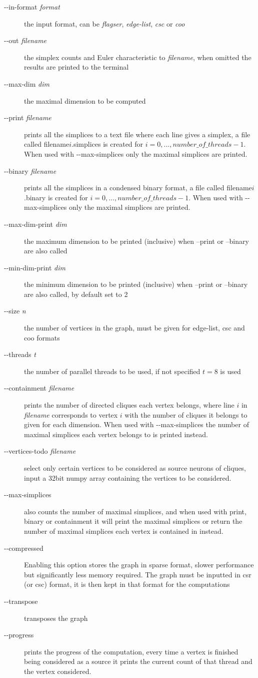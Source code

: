 \documentclass{amsart}
\theoremstyle{definition}
\begin{document}
\enlargethispage{\baselineskip}
\begin{description}
  \item [-{}-in-format \textit{format}] the input format, can be \emph{flagser}, \emph{edge-list}, \emph{csc} or \emph{coo}
  \item [-{}-out \textit{filename}] the simplex counts and Euler characteristic to \textit{filename}, when omitted the results are printed to the terminal
  \item [-{}-max-dim \textit{dim}] the maximal dimension to be computed
  \item [-{}-print \textit{filename}] prints all the simplices to a text file where each line gives a simplex, a file called filename$i$.simplices is created for $i=0,...,number\_of\_threads-1$. When used with -{}-max-simplices only the maximal simplices are printed.
  \item [-{}-binary \textit{filename}] prints all the simplices in a condensed binary format, a file called filename$i$.binary is created for $i=0,...,number\_of\_threads-1$. When used with -{}-max-simplices only the maximal simplices are printed.
  \item [-{}-max-dim-print \textit{dim}] the maximum dimension to be printed (inclusive) when --print or --binary are also called
  \item [-{}-min-dim-print \textit{dim}] the minimum dimension to be printed (inclusive) when --print or --binary are also called, by default set to 2
  \item [-{}-size \textit{n}] the number of vertices in the graph, must be given for edge-list, csc and coo formats
  \item [-{}-threads \textit{t}] the number of parallel threads to be used, if not specified $t=8$ is used
  \item [-{}-containment \textit{filename}] prints the number of directed cliques each vertex belongs, where line $i$ in \textit{filename} corresponds to vertex $i$ with the number of cliques it belongs to given for each dimension. When used with -{}-max-simplices the number of maximal simplices each vertex belongs to is printed instead.
  \item [-{}-vertices-todo \textit{filename}] select only certain vertices to be considered as source neurons of cliques, input a 32bit numpy array containing the vertices to be considered.
  \item [-{}-max-simplices] also counts the number of maximal simplices, and when used with print, binary or containment it will print the maximal simplices or return the number of maximal simplices each vertex is contained in instead.
  \item [-{}-compressed] Enabling this option stores the graph in sparse format, slower performance but significantly less memory required. The graph must be inputted in csr (or csc) format, it is then kept in that format for the computations
  \item [-{}-transpose] transposes the graph
  \item [-{}-progress] prints the progress of the computation, every time a vertex is finished being considered as a source it prints the current count of that thread and the vertex considered.


\end{description}
\end{document}
